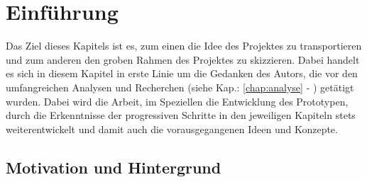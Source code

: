\documentclass[Bachelorarbeit.tex]{subfiles}
\begin{document}
\chapter{Einführung}
\label{chap:einfuehrung}

Das Ziel dieses Kapitels ist es, zum einen die Idee des Projektes zu transportieren und zum anderen den groben Rahmen des Projektes zu skizzieren.
Dabei handelt es sich in diesem Kapitel in erste Linie um die Gedanken des Autors, die vor den umfangreichen Analysen und Recherchen (siehe Kap.: \ref{chap:analyse} - ) getätigt wurden.
Dabei wird die Arbeit, im Speziellen die Entwicklung des Prototypen, durch die Erkenntnisse der progressiven Schritte in den jeweiligen Kapiteln stets weiterentwickelt und damit auch die vorausgegangenen Ideen und Konzepte.


\section{Motivation und Hintergrund}
\label{chap:einfuehrung:sec:hintergrund}
\end{document}
